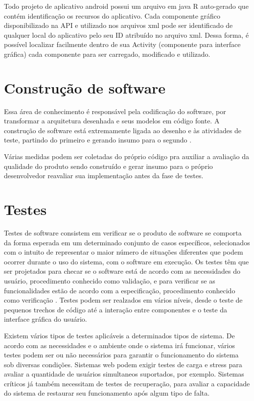 Todo projeto de aplicativo android possui um arquivo em java R auto-gerado que contém identificação os recursos do aplicativo. Cada componente gráfico disponibilizado na API e utilizado nos arquivos xml pode ser identificado de qualquer local do aplicativo pelo seu ID atribuído no arquivo xml. Dessa forma, é possível localizar facilmente dentro de sua Activity (componente para interface gráfica) cada componente para ser carregado, modificado e utilizado.

\section{Construção de software}


Essa área de conhecimento é responsável pela codificação do software, por transformar a arquitetura desenhada e seus modelos em código fonte. A construção de software está extremamente ligada ao desenho e às atividades de teste, partindo do primeiro e gerando insumo para o segundo \cite{swebok}.

Várias medidas podem ser coletadas do próprio código pra auxiliar a avaliação da qualidade do produto sendo construído e gerar insumo para o próprio desenvolvedor reavaliar sua implementação antes da fase de testes.

\section{Testes}


Testes de software consistem em verificar se o produto de software se comporta da forma esperada em um determinado conjunto de casos específicos, selecionados com o intuito de representar o maior número de situações diferentes que podem ocorrer durante o uso do sistema, com o software em execução. Os testes têm que ser projetados para checar se o software está de acordo com as necessidades do usuário, procedimento conhecido como validação, e para verificar se as funcionalidades estão de acordo com a especificação, procedimento conhecido como verificação \cite{swebok}. Testes podem ser realzados em vários níveis, desde o teste de pequenos trechos de código até a interação entre componentes e o teste da interface gráfica do usuário.

Existem vários tipos de testes aplicáveis a determinados tipos de sistema. De acordo com as necessidades e o ambiente onde o sistema irá funcionar, vários testes podem ser ou não necessários para garantir o funcionamento do sistema sob diversas condições. Sistemas web podem exigir testes de carga e stress para avaliar a quantidade de usuários simultaneos suportados, por exemplo. Sistemas críticos já também necessitam de testes de recuperação, para avaliar a capacidade do sistema de restaurar seu funcionamento após algum tipo de falta.

